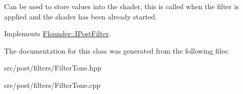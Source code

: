 Can be used to store values into the shader, this is called when the filter is applied and the shader has been already started. 



Implements \hyperlink{class_flounder_1_1_i_post_filter_a20420ec0a9bac67437740552bea9ab74}{Flounder\+::\+I\+Post\+Filter}.



The documentation for this class was generated from the following files\+:\begin{DoxyCompactItemize}
\item 
src/post/filters/Filter\+Tone.\+hpp\item 
src/post/filters/Filter\+Tone.\+cpp\end{DoxyCompactItemize}

